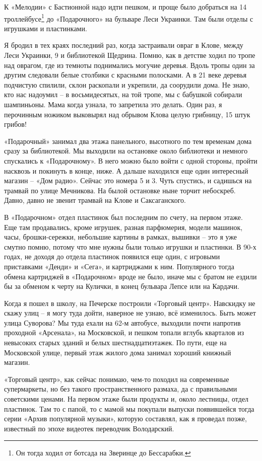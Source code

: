 К «Мелодии» с Бастионной надо идти пешком, и проще было добраться на 14 троллейбусе\footnote{Он тогда ходил от ботсада на Зверинце до Бессарабки.} до «Подарочного» на бульваре Леси Украинки. Там были отделы с игрушками и пластинками.

Я бродил в тех краях последний раз, когда застраивали овраг в Клове, между Леси Украинки, 9 и библиотекой Щедрина. Помню, как в детстве ходил по тропе над оврагом, где из темноты поднимались могучие деревья. Вдоль тропы один за другим следовали белые столбики с красными полосками. А в 21 веке деревья подчистую спилили, склон раскопали и укрепили, да соорудили дома. Не знаю, кто нас надоумил – в восьмидесятых, на той тропе, мы с бабушкой собирали шампиньоны. Мама когда узнала, то запретила это делать. Один раз, я перочинным ножиком выковырял над обрывом Клова целую грибницу, 15 штук грибов!

«Подарочный» занимал два этажа панельного, высотного по тем временам дома сразу за библиотекой. Мы выходили на остановке около библиотеки и немного спускались к «Подарочному». В него можно было войти с одной стороны, пройти насквозь и покинуть в конце, ниже. А дальше находился еще один интересный магазин – «Дом радио». Сейчас это номера 5 и 3. Чуть спустись, и садишься на трамвай по улице Мечникова. На былой остановке ныне торчит небоскреб. Давно, давно не звенит трамвай на Клове и Саксаганского.

В «Подарочном» отдел пластинок был последним по счету, на первом этаже. Еще там продавались, кроме игрушек, разная парфюмерия, модели машинок, часы, брошки-сережки, небольшие картины в рамках, вышивки – это я уже смутно помню, потому что мне нужны были только игрушки и пластинки. В 90-х годах, не доходя до отдела пластинок появился еще один, с игровыми приставками «Денди» и «Сега», и картриджами к ним. Популярного тогда обмена картриджей в «Подарочном» вроде не было, иначе мы с братом не ездили бы за обменом к черту на Кулички, в конец бульвара Лепсе или на Кардачи.

Когда я пошел в школу, на Печерске построили «Торговый центр». Навскидку не скажу улиц – я могу туда дойти, наверное не узнаю, всё изменилось. Быть может улица Суворова? Мы туда ехали на 62-м автобусе, выходили почти напротив проходной «Арсенала», на Московской, и пешком топали вглубь кварталов из невысоких старых зданий и белых шестнадцатиэтажек. По пути, еще на Московской улице, первый этаж жилого дома занимал хороший книжный магазин.

«Торговый центр», как сейчас понимаю, чем-то походил на современные супермаркеты, но без такого пространственного размаха, да с правильными советскими ценами. На первом этаже были продукты и, около лестницы, отдел пластинок. Там то с папой, то с мамой мы покупали выпуски появившейся тогда серии «Архив популярной музыки», которую составлял, как я проведал позже, известный по эпохе видеотек переводчик Володарский. 

